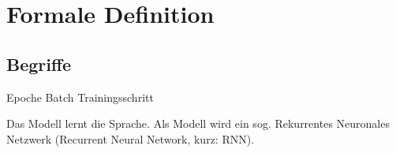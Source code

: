 \section{Formale Definition}
\label{sec:model-definition}

\subsection{Begriffe}
\label{subsec:glossary}

Epoche
Batch
Trainingsschritt

Das Modell lernt die Sprache.
Als Modell wird ein sog. Rekurrentes Neuronales Netzwerk (Recurrent Neural Network, kurz: RNN).


